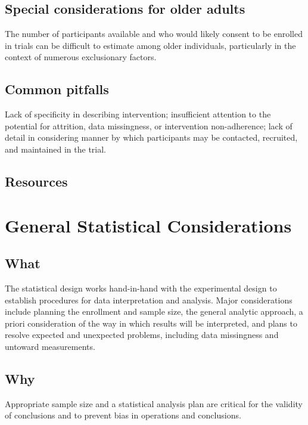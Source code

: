 \documentclass[]{book}
\begin{document}
\subsection{Special considerations for older
adults}\label{special-considerations-for-older-adults}

The number of participants available and who would likely consent to be
enrolled in trials can be difficult to estimate among older individuals,
particularly in the context of numerous exclusionary factors.

\subsection{Common pitfalls}\label{common-pitfalls}

Lack of specificity in describing intervention; insufficient attention
to the potential for attrition, data missingness, or intervention
non-adherence; lack of detail in considering manner by which
participants may be contacted, recruited, and maintained in the trial.

\subsection{Resources}\label{resources}

\section{General Statistical
Considerations}\label{general-statistical-considerations}

\subsection{What}\label{what-2}

The statistical design works hand-in-hand with the experimental design
to establish procedures for data interpretation and analysis. Major
considerations include planning the enrollment and sample size, the
general analytic approach, a priori consideration of the way in which
results will be interpreted, and plans to resolve expected and
unexpected problems, including data missingness and untoward
measurements.

\subsection{Why}\label{why-2}

Appropriate sample size and a statistical analysis plan are critical for
the validity of conclusions and to prevent bias in operations and
conclusions.
\end{document}
